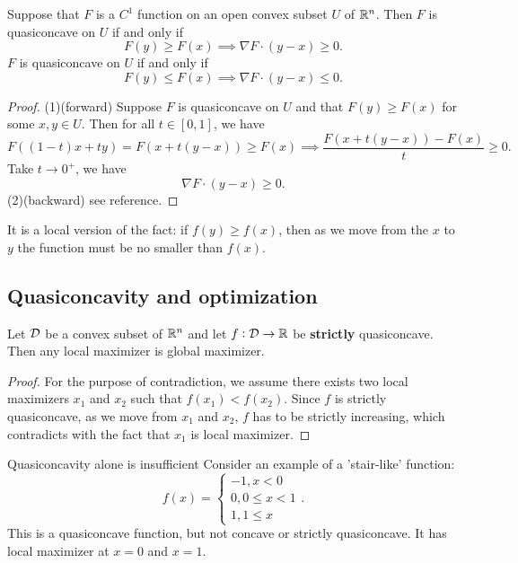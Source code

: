 \begin{refsection}
\begin{lemma}\cite[526]{simon1994mathematics}
	Suppose that $F$ is a $C^1$ function on an open convex subset $U$ of $\mathbb{R}^n$. Then $F$ is quasiconcave on $U$ if and only if 
	$$F(y) \geq F(x) \implies \nabla F \cdot (y-x) \geq 0.$$
	$F$ is quasiconcave on $U$ if and only if 
	$$F(y) \leq F(x) \implies \nabla F \cdot (y-x) \leq 0.$$
\end{lemma}
\begin{proof}
	(1)(forward)
	Suppose $F$ is quasiconcave on $U$ and that $F(y)\geq F(x)$ for some $x,y\in U$. Then for all $t\in [0,1]$, we have
	$$F((1-t)x + ty) =F (x + t(y-x)) \geq  F(x) \implies \frac{F(x + t(y-x)) - F(x)}{t} \geq 0.$$
	Take $t\to 0^+$, we have $$\nabla F \cdot (y - x) \geq 0.$$
	(2)(backward) see reference.
\end{proof}

\begin{remark}[interpretation]
	It is a local version of the fact: if $f(y) \geq f(x)$, then as we move from the $x$ to $y$ the function must be no smaller than $f(x)$. 
\end{remark}


\subsection{Quasiconcavity and optimization}

\begin{theorem}\cite[363]{jiang2000advanced}\label{ch:convex-analysis:th:localOptimalityIsGlobalOptimalityStrictQuasiconcavity}
	Let $\mathcal{D}$ be a convex subset of $\mathbb{R}^n$ and let $f:\mathcal{D}\to \mathbb{R}$ be \textbf{strictly} quasiconcave. Then any local maximizer is global maximizer.	
\end{theorem}
\begin{proof}
	For the purpose of contradiction, we assume there exists two local maximizers $x_1$ and $x_2$ such that $f(x_1) < f(x_2)$. Since $f$ is strictly quasiconcave, as we move from $x_1$ and $x_2$, $f$ has to be strictly increasing, which contradicts with the fact that $x_1$ is local maximizer. 
\end{proof}


\begin{note}
	Quasiconcavity alone is insufficient Consider an example of  a 'stair-like' function:
	$$f(x) = \begin{cases}
	-1, x < 0 \\
	0, 0\leq x < 1 \\
	1, 1\leq x
	\end{cases}.$$
	This is a quasiconcave function, but not concave or strictly quasiconcave. It has local maximizer at $x = 0$ and $x=1$.
\end{note}



\end{refsection}
